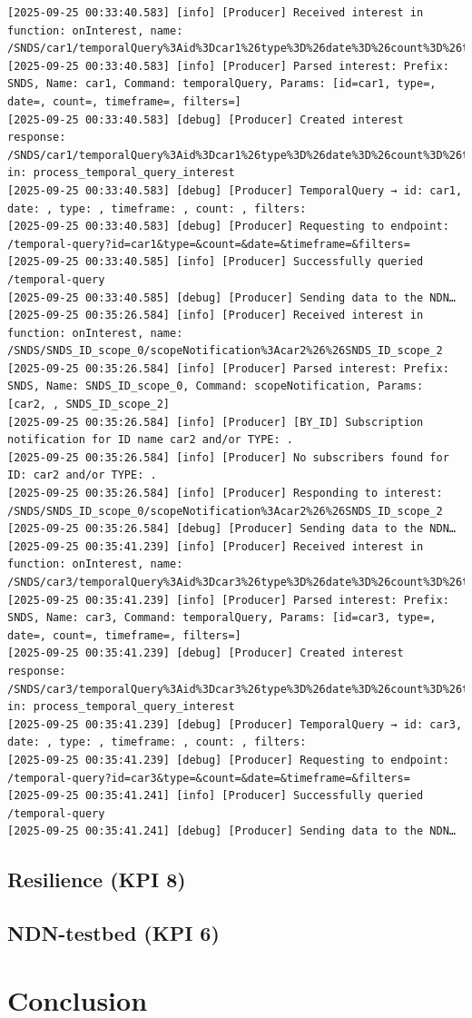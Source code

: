 \documentclass{article}
\begin{document}
\begin{lstlisting}[language=log, caption={Producer Log File},label={lst:producer-log-file}]
[2025-09-25 00:33:40.583] [info] [Producer] Received interest in function: onInterest, name: /SNDS/car1/temporalQuery%3Aid%3Dcar1%26type%3D%26date%3D%26count%3D%26timeframe%3D%26filters%3D
[2025-09-25 00:33:40.583] [info] [Producer] Parsed interest: Prefix: SNDS, Name: car1, Command: temporalQuery, Params: [id=car1, type=, date=, count=, timeframe=, filters=]
[2025-09-25 00:33:40.583] [debug] [Producer] Created interest response: /SNDS/car1/temporalQuery%3Aid%3Dcar1%26type%3D%26date%3D%26count%3D%26timeframe%3D%26filters%3D in: process_temporal_query_interest
[2025-09-25 00:33:40.583] [debug] [Producer] TemporalQuery → id: car1, date: , type: , timeframe: , count: , filters: 
[2025-09-25 00:33:40.583] [debug] [Producer] Requesting to endpoint: /temporal-query?id=car1&type=&count=&date=&timeframe=&filters=
[2025-09-25 00:33:40.585] [info] [Producer] Successfully queried /temporal-query
[2025-09-25 00:33:40.585] [debug] [Producer] Sending data to the NDN…
[2025-09-25 00:35:26.584] [info] [Producer] Received interest in function: onInterest, name: /SNDS/SNDS_ID_scope_0/scopeNotification%3Acar2%26%26SNDS_ID_scope_2
[2025-09-25 00:35:26.584] [info] [Producer] Parsed interest: Prefix: SNDS, Name: SNDS_ID_scope_0, Command: scopeNotification, Params: [car2, , SNDS_ID_scope_2]
[2025-09-25 00:35:26.584] [info] [Producer] [BY_ID] Subscription notification for ID name car2 and/or TYPE: .
[2025-09-25 00:35:26.584] [info] [Producer] No subscribers found for ID: car2 and/or TYPE: .
[2025-09-25 00:35:26.584] [info] [Producer] Responding to interest: /SNDS/SNDS_ID_scope_0/scopeNotification%3Acar2%26%26SNDS_ID_scope_2
[2025-09-25 00:35:26.584] [debug] [Producer] Sending data to the NDN…
[2025-09-25 00:35:41.239] [info] [Producer] Received interest in function: onInterest, name: /SNDS/car3/temporalQuery%3Aid%3Dcar3%26type%3D%26date%3D%26count%3D%26timeframe%3D%26filters%3D
[2025-09-25 00:35:41.239] [info] [Producer] Parsed interest: Prefix: SNDS, Name: car3, Command: temporalQuery, Params: [id=car3, type=, date=, count=, timeframe=, filters=]
[2025-09-25 00:35:41.239] [debug] [Producer] Created interest response: /SNDS/car3/temporalQuery%3Aid%3Dcar3%26type%3D%26date%3D%26count%3D%26timeframe%3D%26filters%3D in: process_temporal_query_interest
[2025-09-25 00:35:41.239] [debug] [Producer] TemporalQuery → id: car3, date: , type: , timeframe: , count: , filters: 
[2025-09-25 00:35:41.239] [debug] [Producer] Requesting to endpoint: /temporal-query?id=car3&type=&count=&date=&timeframe=&filters=
[2025-09-25 00:35:41.241] [info] [Producer] Successfully queried /temporal-query
[2025-09-25 00:35:41.241] [debug] [Producer] Sending data to the NDN… 
\end{lstlisting}

\subsection{Resilience (KPI 8)}
\subsection{NDN-testbed (KPI 6)}
\section{Conclusion}
\end{document}
